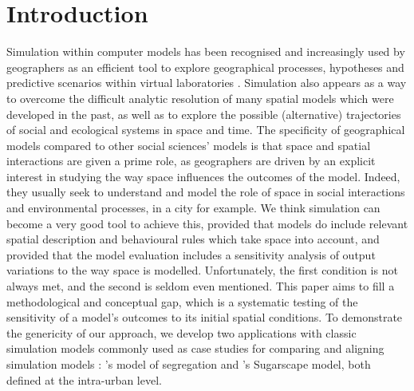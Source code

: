 \documentclass[Royal,sageh,times]{sagej}
\begin{document}

\maketitle



\section{Introduction}

Simulation within computer models has been recognised and increasingly used by geographers as an efficient tool to explore geographical processes, hypotheses and predictive scenarios within virtual laboratories \citep{batty1971modelling, batty2007model, carley1999generating, Quesneletal2009}.  Simulation also appears as a way to overcome the difficult analytic resolution of many spatial models which were developed in the past, as well as to explore the possible (alternative) trajectories of social and ecological systems in space and time. The specificity of geographical models compared to other social sciences' models is that space and spatial interactions are given a prime role, as geographers are driven by an explicit interest in studying the way space influences the outcomes of the model. Indeed, they usually seek to understand and model the role of space in social interactions and environmental processes, in a city for example. We think simulation can become a very good tool to achieve this, provided that models do include relevant spatial description and behavioural rules which take space into account, and provided that the model evaluation includes a sensitivity analysis of output variations to the way space is modelled. Unfortunately, the first condition is not always met, and the second is seldom even mentioned. This paper aims to fill a methodological and conceptual gap, which is a systematic testing of the sensitivity of a model's outcomes to its initial spatial conditions. To demonstrate the genericity of our approach, we develop two applications with classic simulation models commonly used as case studies for comparing and aligning simulation models \citep{Axtelletal1996, wilensky2007making}: \citet{schelling1971dynamic}'s model of segregation and \citet{EpsteinAxtell1996}'s Sugarscape model, both defined at the intra-urban level.\\
\end{document}
